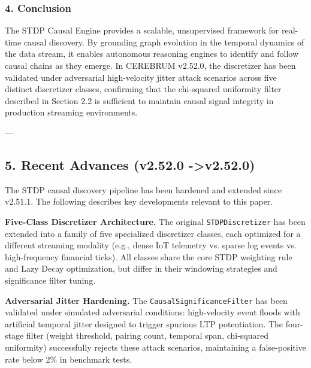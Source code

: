 \subsubsection{4. Conclusion}
The STDP Causal Engine provides a scalable, unsup\-ervised framework for real-time causal discovery. By grounding graph evolution in the temporal dynamics of the data stream, it enables autonomous reasoning engines to identify and follow causal chains as they emerge. In CEREBRUM v2.52.0, the discretizer has been validated under adversarial high-velocity jitter attack scenarios across five distinct discretizer classes, confirming that the chi-squared uniformity filter described in Section 2.2 is sufficient to maintain causal signal integrity in production streaming envir\-onments.

---

\subsection{5. Recent Advances (v2.52.0 -\textgreater  v2.52.0)}

The STDP causal discovery pipeline has been hardened and extended since v2.51.1. The following describes key devel\-opments relevant to this paper.

\textbf{Five-Class Discretizer Archit\-ecture.} The original \texttt{STDPDiscretizer} has been extended into a family of five specialized discretizer classes, each optimized for a different streaming modality (e.g., dense IoT telemetry vs. sparse log events vs. high-frequency financial ticks). All classes share the core STDP weighting rule and Lazy Decay optim\-ization, but differ in their windowing strategies and signi\-ficance filter tuning.

\textbf{Adversarial Jitter Hardening.} The \texttt{CausalSignificanceFilter} has been validated under simulated adversarial conditions: high-velocity event floods with artificial temporal jitter designed to trigger spurious LTP poten\-tiation. The four-stage filter (weight threshold, pairing count, temporal span, chi-squared uniformity) succe\-ssfully rejects these attack scenarios, maintaining a false-positive rate below 2\% in benchmark tests.

